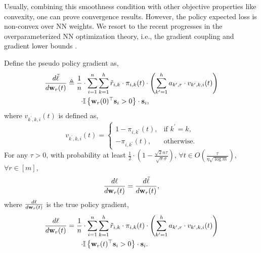 Usually, combining this smoothness condition with other objective properties like convexity, one can prove convergence results. However, the policy expected loss is non-convex over NN weights. We resort to the recent progresses in the overparameterized NN optimization theory, i.e., the gradient coupling and gradient lower bounds \citep{li2018learning}.

\begin{lem}
\label{lem:gradient_coupling}
	Define the pseudo policy gradient as,
\begin{equation*}
\begin{split}
	\frac{d \tilde{\ell}}{d {\mathbf{w}}_r(t)} &\triangleq \frac{1}{n} \cdot \sum\limits_{i=1}^{n}{ \sum\limits_{k=1}^{h}{ \tilde{r}_{i,k} \cdot \pi_{i,k}(t) \cdot \left( \sum\limits_{k^\prime = 1}^{h}{ a_{k^\prime,r}  \cdot v_{k^\prime,k,i}(t) } \right) } } \\
	&\qquad { { \cdot {\mathbb{I}}\left\{ {\mathbf{w}}_r(0)^\top {\mathbf{s}}_i > 0 \right\} \cdot {\mathbf{s}}_i } },
\end{split}
\end{equation*}
where $v_{k^\prime,k,i}(t)$ is defined as,
\begin{equation*}
	v_{k^\prime,k,i}(t) = \begin{cases}
    1 - \pi_{i,k^\prime}(t), & \text{if $k^\prime = k$}, \\
    - \pi_{i,k^\prime}(t), & \text{otherwise}.
  \end{cases}
\end{equation*}
	For any $\tau > 0$, with probability at least $\frac{1}{2} \cdot \left( 1 - \frac{\sqrt{2}n\tau}{\sqrt{\pi}\sigma} \right)$, $\forall t \in O\left(\frac{\tau}{\eta  \sqrt{\log{m}}}\right)$, $\forall r \in [m]$,
\begin{equation}
	\frac{d\ell}{d {\mathbf{w}}_r(t)} = \frac{d \tilde{\ell}}{d {\mathbf{w}}_r(t)},
\end{equation}
where $\frac{d\ell}{d {\mathbf{w}}_r(t)}$ is the true policy gradient,
\begin{equation*}
\begin{split}
    \frac{d\ell}{d {\mathbf{w}}_r(t)} &= \frac{1}{n} \cdot \sum\limits_{i=1}^{n}{ \sum\limits_{k=1}^{h}{  \tilde{r}_{i,k} \cdot \pi_{i,k}(t) \cdot \left( \sum\limits_{k^\prime = 1}^{h}{ a_{k^\prime,r}  \cdot v_{k^\prime,k,i}(t) } \right) }} \\
    &\qquad  {{ \cdot {\mathbb{I}}\left\{ {\mathbf{w}}_r(t)^\top {\mathbf{s}}_i > 0 \right\} \cdot {\mathbf{s}}_i } }.
\end{split}
\end{equation*}
\end{lem}


